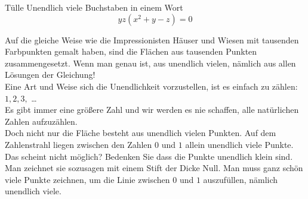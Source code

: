 \begin{surferPage}{Tülle}
Unendlich viele Buchstaben in einem Wort\\
\smallskip
\[y z (x^2	+ y - z)	= 0\]


\singlespacing
Auf die gleiche Weise wie die Impressionisten Häuser und Wiesen mit tausenden Farbpunkten gemalt haben, sind die Flächen aus tausenden Punkten zusammengesetzt. Wenn man genau ist, aus unendlich vielen, nämlich aus allen Lösungen der Gleichung!\\
\singlespacing
Eine Art und Weise sich die Unendlichkeit vorzustellen, ist es einfach zu zählen: $1, 2, 3,$ \dots\\
Es gibt immer eine größere Zahl und wir werden es nie schaffen, alle natürlichen Zahlen aufzuzählen.\\
\singlespacing
Doch nicht nur die Fläche besteht aus unendlich vielen Punkten. Auf dem Zahlenstrahl liegen zwischen den Zahlen $0$ und $1$ allein unendlich viele Punkte. Das scheint nicht möglich? Bedenken Sie dass die Punkte unendlich klein sind. Man zeichnet sie sozusagen mit einem Stift der Dicke Null. Man muss ganz schön viele Punkte zeichnen, um die Linie zwischen $0$ und $1$ auszufüllen, nämlich unendlich viele. 
\end{surferPage}

